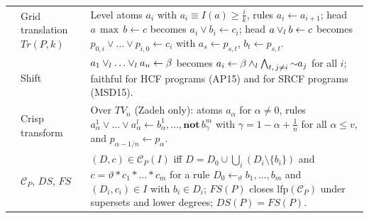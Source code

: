 {\begin{longtable}{@{}p{}p{}p{}@{}}
            \cite{MushthofaSD14}                                                                     & Grid translation $\mathit{Tr}(P,k)$                      & Level atoms $a_i$ with $a_i\equiv I(a)\geq\frac ik$, rules $a_i\leftarrow a_{i+1}$; head $a\,\max\,b\leftarrow c$ becomes $a_i\lor b_i\leftarrow c_i$; head $a\lor_l b\leftarrow c$ becomes $p_{0,i}\lor\dots\lor p_{i,0}\leftarrow c_i$ with $a_s\leftarrow p_{s,t}$, $b_t\leftarrow p_{s,t}$.                                                                                                                                                                                 \\
            \cite{MushthofaSD15,AlvianoP15}                                                          & Shift                                                    & $a_1\flpor_l\dots\flpor_l a_n\leftarrow\beta$ becomes $a_i\leftarrow\beta\land_l\bigwedge\nolimits_{t,\,j\neq i}\mathord{\sim} a_j$ for all $i$; faithful for HCF programs (AP15) and for SRCF programs (MSD15).                                                                                                                                                                                                                                                                       \\
            \cite{LukasiewiczS07}                                                                    & Crisp transform                                          & Over $\mathit{TV}_n$ (Zadeh only): atoms $a_\alpha$ for $\alpha\neq0$, rules $a^1_\alpha\lor\dots\lor a^l_\alpha\leftarrow b^1_\alpha,\dots,\mathbf{not}\,b^m_\gamma$ with $\gamma=1-\alpha+\frac1n$ for all $\alpha\leq v$, and $p_{\alpha-1/n}\leftarrow p_\alpha$.                                                                                                                                                                                                             \\
            \cite{Guller2004procedural}                                                              & $\mathcal{C}_P$, $\mathit{DS}$, $\mathit{FS}$            & $(D,c)\in\mathcal{C}_P(I)$ iff $D=D_0\cup\bigcup_i(D_i\setminus\{b_i\})$ and $c=\vartheta\ast c_1\ast\dots\ast c_m$ for a rule $D_0\leftarrow_\vartheta b_1,\dots,b_m$ and $(D_i,c_i)\in I$ with $b_i\in D_i$; $\mathit{FS}(P)$ closes $\mathrm{lfp}(\mathcal{C}_P)$ under supersets and lower degrees; $\mathit{DS}(P)=\mathit{FS}(P)$.                                                                                                                                          \\

\end{longtable}}
